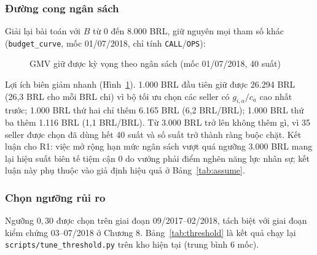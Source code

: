 \subsubsection*{Đường cong ngân sách}
Giải lại bài toán với $B$ từ 0 đến 8.000 BRL, giữ nguyên mọi tham số khác (\texttt{budget\_curve}, mốc 01/07/2018, chỉ tính \texttt{CALL}/\texttt{OPS}):

\begin{figure}[htbp]
\centering
{}
\caption{GMV giữ được kỳ vọng theo ngân sách (mốc 01/07/2018, 40 suất)}
\label{fig:budget_curve}
\end{figure}

Lợi ích biên giảm nhanh (Hình~\ref{fig:budget_curve}). 1.000 BRL đầu tiên giữ được 26.294 BRL (26,3 BRL cho mỗi BRL chi) vì bộ tối ưu chọn các seller có $g_{i,a}/c_a$ cao nhất trước; 1.000 BRL thứ hai chỉ thêm 6.165 BRL (6,2 BRL/BRL); 1.000 BRL thứ ba thêm 1.116 BRL (1,1 BRL/BRL). Từ 3.000 BRL trở lên không thêm gì, vì 35 seller được chọn đã dùng hết 40 suất và số suất trở thành ràng buộc chặt. Kết luận cho R1: việc mở rộng hạn mức ngân sách vượt quá ngưỡng 3.000 BRL mang lại hiệu suất biên tế tiệm cận 0 do vướng phải điểm nghẽn năng lực nhân sự; kết luận này phụ thuộc vào giả định hiệu quả ở Bảng~\ref{tab:assume}.

\subsubsection*{Chọn ngưỡng rủi ro}
Ngưỡng $0{,}30$ được chọn trên giai đoạn 09/2017--02/2018, tách biệt với giai đoạn kiểm chứng 03--07/2018 ở Chương 8. Bảng~\ref{tab:threshold} là kết quả chạy lại \texttt{scripts/tune\_threshold.py} trên kho hiện tại (trung bình 6 mốc).

